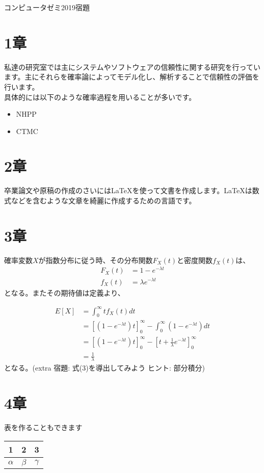 \documentclass[a4paper,12pt]{article}
\begin{document}
\begin{center}
{\large コンピュータゼミ2019宿題}
\end{center}
\section{1章}
私達の研究室では主にシステムやソフトウェアの信頼性に関する研究を行っています。主にそれらを確率論によってモデル化し、解析することで信頼性の評価を行います。\\
具体的には以下のような確率過程を用いることが多いです。
\begin{itemize}
\item NHPP
\item CTMC
\end{itemize}

\section{2章}
卒業論文や原稿の作成のさいには\LaTeX{}を使って文書を作成します。\LaTeX{}は数式などを含むような文章を綺麗に作成するための言語です。

\section{3章}
確率変数$X$が指数分布に従う時、その分布関数$F_X(t)$と密度関数$f_X(t)$は、
\begin{align}
F_X(t)  &=  1-e^{-\lambda t} \label{F_X}\\
f_X(t)  &=  \lambda e^{-\lambda t} \label{f_X}
\end{align}
となる。またその期待値は定義より、

\begin{align}
E[X] &=  \int^\infty _0 tf_X (t)dt \nonumber\\
&=  [(1-e^{-\lambda t})t]^\infty _0 - \int^\infty _0 (1-e^{-\lambda t})dt \nonumber\\
&=  [(1-e^{-\lambda t})t]^\infty _0 - [t+ \frac{1}{\lambda} e^{-\lambda t}]^\infty _0 \nonumber\\
&=  \frac{1}{\lambda} \label{E_X}
\end{align}
となる。(extra 宿題: 式(3)を導出してみよう ヒント: 部分積分)

\section{4章}
表を作ることもできます
\begin{center}
\begin{tabular}{|c|c|c|}\hline
 1 & 2 & 3 \\\hline
 $\alpha$&$\beta$&$\gamma$\\\hline
\end{tabular}
\end{center}
\end{document}
